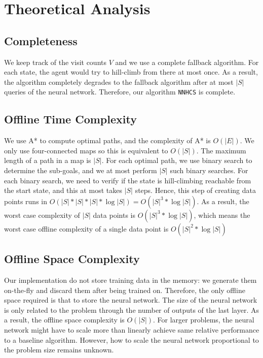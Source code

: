 \documentclass[letterpaper]{article}
\numberwithin{equation}{section}
\numberwithin{theorem}{section}
\numberwithin{lemma}{section}
\numberwithin{df}{section}
\begin{document}
    \section{Theoretical Analysis}\label{sec:theoretical-analysis}


    \subsection{Completeness}\label{subsec:completeness}

    We keep track of the visit counts $V$ and we use a complete fallback algorithm.
    For each state, the agent would try to hill-climb from there at most once.
    As a result, the algorithm completely degrades to the fallback algorithm after at most $|S|$ queries of the neural network.
    Therefore, our algorithm \texttt{NNHCS} is complete.

    \subsection{Offline Time Complexity}\label{subsec:offline-time-complexity}
    We use A* to compute optimal paths, and the complexity of A* is $O(|E|)$.
    We only use four-connected maps so this is equivalent to $O(|S|)$.
    The maximum length of a path in a map is $|S|$.
    For each optimal path, we use binary search to determine the sub-goals, and we at most perform $|S|$ such binary searches.
    For each binary search, we need to verify if the state is hill-climbing reachable from the start state, and this at most takes $|S|$ steps.
    Hence, this step of creating data points runs in $O(|S| * |S| * |S| * \log{|S|}) = O(|S|^3 * \log{|S|})$.
    As a result, the worst case complexity of $|S|$ data points is $O(|S|^3 * \log{|S|})$,
    which means the worst case offline complexity of a single data point is $O(|S|^2 * \log{|S|})$

    \subsection{Offline Space Complexity}\label{subsec:offline-space-complexity}
    Our implementation do not store training data in the memory: we generate them on-the-fly and discard them after being trained on.
    Therefore, the only offline space required is that to store the neural network.
    The size of the neural network is only related to the problem through the number of outputs of the last layer.
    As a result, the offline space complexity is $O(|S|)$.
    For larger problems, the neural network might have to scale more than linearly achieve same relative performance to a baseline algorithm.
    However, how to scale the neural network proportional to the problem size remains unknown.
\end{document}
